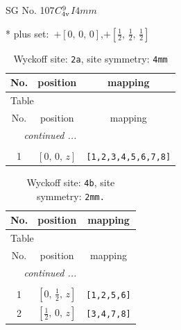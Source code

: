 \documentclass[fleqn,8pt]{jsarticle}
\begin{document}
\setcounter{MaxMatrixCols}{32}

\renewcommand{\tablename}{Table~}
\renewcommand{\figurename}{Figure~}
\begin{center}
\LARGE
SG No. 107\quad$C_{\rm 4v}^{9}$\quad$I4mm$\quad[ tetragonal ]
\end{center}
* plus set:\,\,\,$+\left[ 0,\, 0,\, 0 \right]$,\quad $+\left[ \frac{1}{2},\, \frac{1}{2},\, \frac{1}{2} \right]$
\renewcommand{\arraystretch}{1.2}
\begin{longtable}{ccc}
\caption{Wyckoff site: {\tt 2a}, site symmetry: {\tt 4mm}}
 \\
 \hline \hline
No. & position & mapping \\ \hline \endfirsthead

\multicolumn{2}{l}{\tablename\ \thetable{}} \\
 \hline \hline
No. & position & mapping \\ \hline \endhead

 \hline \hline
\multicolumn{2}{r}{\footnotesize\it continued ...} \\ \endfoot

 \hline \hline
\multicolumn{2}{r}{} \\ \endlastfoot

1 & $\left[ 0,\, 0,\, z \right]$ & {\tt [1,2,3,4,5,6,7,8]} \\
\end{longtable}
\renewcommand{\arraystretch}{1.2}
\begin{longtable}{ccc}
\caption{Wyckoff site: {\tt 4b}, site symmetry: {\tt 2mm.}}
 \\
 \hline \hline
No. & position & mapping \\ \hline \endfirsthead

\multicolumn{2}{l}{\tablename\ \thetable{}} \\
 \hline \hline
No. & position & mapping \\ \hline \endhead

 \hline \hline
\multicolumn{2}{r}{\footnotesize\it continued ...} \\ \endfoot

 \hline \hline
\multicolumn{2}{r}{} \\ \endlastfoot

1 & $\left[ 0,\, \frac{1}{2},\, z \right]$ & {\tt [1,2,5,6]} \\ \hline
2 & $\left[ \frac{1}{2},\, 0,\, z \right]$ & {\tt [3,4,7,8]} \\
\end{longtable}
\renewcommand{\arraystretch}{1.2}
\end{document}
